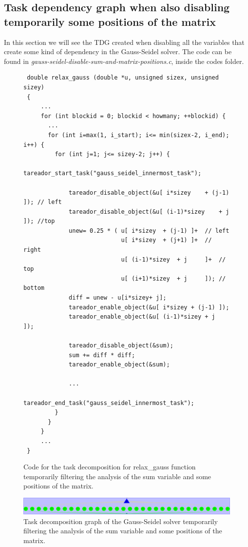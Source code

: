 \documentclass[12pt, a4paper]{article}
\begin{document}
\subsection{Task dependency graph when also disabling temporarily some positions of the matrix}

In this section we will see the TDG created when disabling all the variables that create some kind of dependency in the Gauss-Seidel solver. The code can be found in \textit{gauss-seidel-disable-sum-and-matrix-positions.c}, inside the codes folder.

\begin{figure}[H]
\begin{lstlisting}
 double relax_gauss (double *u, unsigned sizex, unsigned sizey)
 {
     ...
     for (int blockid = 0; blockid < howmany; ++blockid) {
       ...
       for (int i=max(1, i_start); i<= min(sizex-2, i_end); i++) {
         for (int j=1; j<= sizey-2; j++) {
			 tareador_start_task("gauss_seidel_innermost_task");
 				
			 tareador_disable_object(&u[ i*sizey	+ (j-1) ]); // left
			 tareador_disable_object(&u[ (i-1)*sizey	+ j     ]); //top
			 unew= 0.25 * ( u[ i*sizey	+ (j-1) ]+  // left
 				   			u[ i*sizey	+ (j+1) ]+  // right
				    		u[ (i-1)*sizey	+ j     ]+  // top
				    		u[ (i+1)*sizey	+ j     ]); // bottom
			 diff = unew - u[i*sizey+ j];
			 tareador_enable_object(&u[ i*sizey	+ (j-1) ]);
			 tareador_enable_object(&u[ (i-1)*sizey	+ j     ]);
 			
			 tareador_disable_object(&sum);
			 sum += diff * diff; 
			 tareador_enable_object(&sum);
 			
			 ...
			 tareador_end_task("gauss_seidel_innermost_task");
         }
       }
     }
	 ...
 }
\end{lstlisting}
\caption{Code for the task decomposition for relax\_gauss function temporarily filtering the analysis of the sum variable and some positions of the matrix.}
\end{figure}

\begin{figure}[H]
	\centering
	\includegraphics[scale=0.15]{./images/tareador-gauss-seidel-2b-sum-vector}
	\caption{Task decomposition graph of the Gauss-Seidel solver temporarily filtering the analysis of the sum variable and some positions of the matrix.}
\end{figure}

\label{sec:TDGAllDisablesGaussSeidel}
\end{document}
